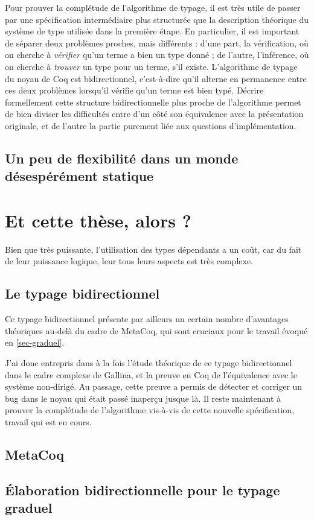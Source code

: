 Pour prouver la complétude de l’algorithme de typage, il est très utile de
passer par une spécification intermédiaire plus structurée que la description
théorique du système de type utilisée dans la première étape.
En particulier, il est important de séparer deux problèmes proches, mais
différents :
d'une part, la vérification, où on cherche à \emph{vérifier}
qu’un terme a bien un type
donné ; de l’autre, l’inférence, où on cherche à \emph{trouver}
un type pour un terme, s'il existe.
L’algorithme de typage du noyau de Coq est bidirectionnel,
c'est-à-dire qu’il alterne en permanence entre ces deux problèmes
lorsqu’il vérifie qu’un terme est bien typé.
Décrire formellement cette structure bidirectionnelle plus proche de l’algorithme
permet de bien diviser les difficultés entre d’un côté
son équivalence avec la présentation
originale, et de l’autre la partie purement liée aux questions d’implémentation.

\subsection{Un peu de flexibilité dans un monde désespérément statique}


\section{Et cette thèse, alors ?}
\label{sec:cette-these}

Bien que très puissante, l’utilisation des types dépendants a un coût,
car du fait de leur puissance logique, leur  tous leurs aspects
est très complexe.

\subsection{Le typage bidirectionnel}

Ce typage bidirectionnel présente par ailleurs un certain nombre d’avantages théoriques au-delà du cadre de MetaCoq, qui sont cruciaux pour le travail évoqué en \cref{sec-graduel}.

J’ai donc entrepris dans \cite{LennonBertrand2021} à la fois l’étude théorique de ce typage bidirectionnel dans le cadre complexe de Gallina, et la preuve en Coq de l’équivalence avec le système non-dirigé.
Au passage, cette preuve a permis de détecter et corriger un bug dans le noyau qui était passé inaperçu jusque là.
Il reste maintenant à prouver la complétude de l’algorithme vis-à-vis de cette nouvelle spécification, travail qui est en cours.

\subsection{MetaCoq}

\subsection{Élaboration bidirectionnelle pour le typage graduel}
